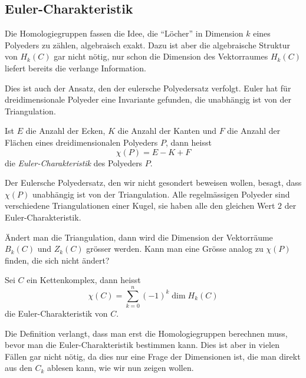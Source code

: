 \subsection{Euler-Charakteristik}
Die Homologiegruppen fassen die Idee, die ``Löcher'' in 
Dimension $k$ eines Polyeders zu zählen, algebraisch exakt.
Dazu ist aber die algebraische Struktur von $H_k(C)$  gar 
nicht nötig, nur schon die Dimension des Vektorraumes $H_k(C)$
liefert bereits die verlange Information.

Dies ist auch der Ansatz, den der eulersche Polyedersatz verfolgt.
Euler hat für dreidimensionale Polyeder eine Invariante gefunden, 
die unabhängig ist von der Triangulation.

\begin{definition}
\label{buch:homologie:def:eulerchar}
Ist $E$ die Anzahl der Ecken, $K$ die Anzahl der Kanten und $F$
die Anzahl der Flächen eines dreidimensionalen Polyeders $P$, dann
heisst
\[
\chi(P) = E-K+F
\]
die {\em Euler-Charakteristik} des Polyeders $P$.
\end{definition}

Der Eulersche Polyedersatz, den wir nicht gesondert beweisen
wollen, besagt, dass $\chi(P)$ unabhängig ist von der 
Triangulation.
Alle regelmässigen Polyeder sind verschiedene Triangulationen
einer Kugel, sie haben alle den gleichen Wert $2$
der Euler-Charakteristik.

Ändert man die Triangulation, dann wird die Dimension der
Vektorräume $B_k(C)$ und $Z_k(C)$ grösser werden.
Kann man eine Grösse analog zu $\chi(P)$ finden, die sich nicht ändert?

\begin{definition}
Sei $C$ ein Kettenkomplex, dann heisst
\[
\chi(C) = \sum_{k=0}^n (-1)^k\dim H_k(C)
\]
die Euler-Charakteristik von $C$.
\end{definition}

Die Definition verlangt, dass man erst die Homologiegruppen
berechnen muss, bevor man die Euler-Charakteristik bestimmen
kann.
Dies ist aber in vielen Fällen gar nicht nötig, da dies nur
eine Frage der Dimensionen ist, die man direkt aus den
$C_k$ ablesen kann, wie wir nun zeigen wollen.


